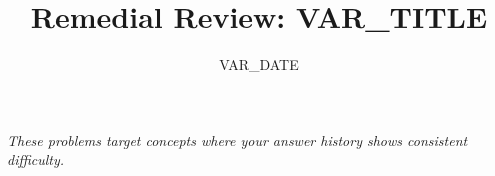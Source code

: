 \documentclass[12pt]{article}
\title{Remedial Review: VAR_TITLE}
\author{}
\date{VAR_DATE}
\newcounter{problem}
\begin{document}
\maketitle
\thispagestyle{plain}

\noindent\textit{These problems target concepts where your answer history shows consistent difficulty.}
\vspace{0.4cm}


\end{document}
